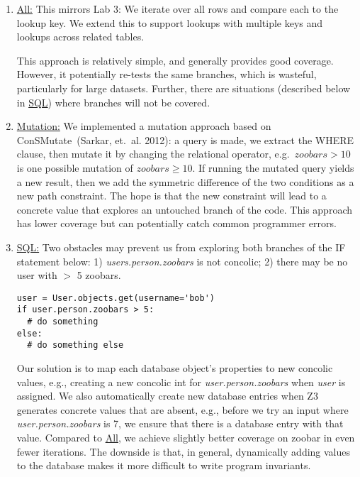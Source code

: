 \documentclass{article}
\begin{document}
\begin{enumerate}
\item \underline{All:}
  This mirrors Lab 3: We iterate over all rows and compare each to the lookup
  key.
  We extend this 
  to support lookups with multiple keys and lookups across
  related tables.

  This approach is relatively simple, and generally provides good
  coverage. However, it potentially re-tests the same branches,
  which is wasteful, particularly for large datasets. Further, there are situations (described
  below in \underline{SQL}) where branches will not be covered.

\item \underline{Mutation:}
  We implemented a mutation approach based on ConSMutate~(Sarkar,
  et.\ al. 2012): a query is made, we extract the WHERE clause,
  then mutate it by changing the relational operator, e.g.\, 
  $\textit{zoobars} > 10$ is one possible mutation of $\textit{zoobars}
  \geq 10$. If running the mutated query yields a new result, then we
  add the symmetric difference of the two conditions as a new path
  constraint. The hope is that the new constraint will lead to a
  concrete value that explores an untouched branch of the code. This
  approach has lower coverage but can potentially catch common
  programmer errors.

\item \underline{SQL:}
  Two obstacles may prevent us from exploring both branches of the IF statement
  below:
  1) \textit{users.person.zoobars} is not
  concolic; 2) there may be no user with $>$ 5 zoobars.
  \begin{verbatim}user = User.objects.get(username='bob')
if user.person.zoobars > 5:
  # do something
else:
  # do something else\end{verbatim}
  Our solution is to map each database object's properties to new concolic
  values, e.g., creating a new concolic int for
  \textit{user.person.zoobars} when \textit{user} is assigned. We also
  automatically create new database entries when Z3 generates
  concrete values that are absent, e.g., before we try an input where
  \textit{user.person.zoobars} is 7, we ensure that there is a
  database entry with that value. Compared to \underline{All}, we
  achieve slightly better coverage on zoobar in even fewer iterations.
  The downside is that, in general, dynamically adding values to the
  database makes it more difficult to write program invariants.
\end{enumerate}
\end{document}
